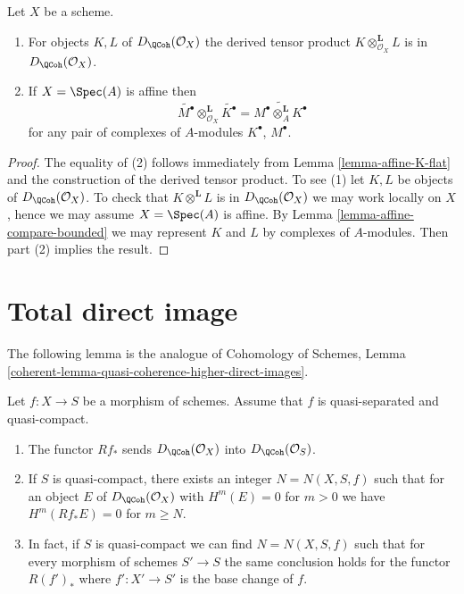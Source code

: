 \begin{lemma}
\label{lemma-quasi-coherence-tensor-product}
Let $X$ be a scheme.
\begin{enumerate}
\item For objects $K, L$ of $D_\QCoh(\mathcal{O}_X)$
the derived tensor product $K \otimes^\mathbf{L}_{\mathcal{O}_X} L$ is in
$D_\QCoh(\mathcal{O}_X)$.
\item If $X = \Spec(A)$ is affine then
$$
\widetilde{M^\bullet} \otimes_{\mathcal{O}_X}^\mathbf{L} \widetilde{K^\bullet}
=
\widetilde{M^\bullet \otimes_A^\mathbf{L} K^\bullet}
$$
for any pair of complexes of $A$-modules $K^\bullet$, $M^\bullet$.
\end{enumerate}
\end{lemma}

\begin{proof}
The equality of (2) follows immediately from Lemma \ref{lemma-affine-K-flat}
and the construction of the derived tensor product.
To see (1) let $K, L$ be objects of $D_\QCoh(\mathcal{O}_X)$.
To check that $K \otimes^\mathbf{L} L$ is in
$D_\QCoh(\mathcal{O}_X)$ we may work locally on $X$, hence
we may assume $X = \Spec(A)$ is affine. By
Lemma \ref{lemma-affine-compare-bounded} we may represent
$K$ and $L$ by complexes of $A$-modules. Then part (2) implies
the result.
\end{proof}





\section{Total direct image}
\label{section-total-direct-image}

\noindent
The following lemma is the analogue of
Cohomology of Schemes, Lemma
\ref{coherent-lemma-quasi-coherence-higher-direct-images}.

\begin{lemma}
\label{lemma-quasi-coherence-direct-image}
Let $f : X \to S$ be a morphism of schemes.
Assume that $f$ is quasi-separated and quasi-compact.
\begin{enumerate}
\item The functor $Rf_*$ sends $D_\QCoh(\mathcal{O}_X)$
into $D_\QCoh(\mathcal{O}_S)$.
\item If $S$ is quasi-compact, there exists an integer $N = N(X, S, f)$
such that for an object $E$ of $D_\QCoh(\mathcal{O}_X)$
with $H^m(E) = 0$ for $m > 0$ we have
$H^m(Rf_*E) = 0$ for $m \geq N$.
\item In fact, if $S$ is quasi-compact we can find $N = N(X, S, f)$
such that for every morphism of schemes $S' \to S$
the same conclusion holds for the functor $R(f')_*$
where $f' : X' \to S'$ is the base change of $f$.
\end{enumerate}
\end{lemma}


